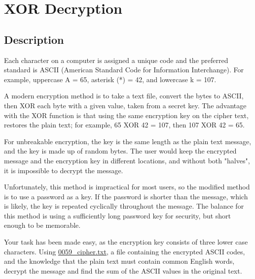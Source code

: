 \section{XOR Decryption}
\subsection{Description}
Each character on a computer is assigned a unique code and the preferred standard is ASCII (American Standard Code for
Information Interchange). For example, uppercase A = 65, asterisk (*) = 42, and lowercase k = 107.

A modern encryption method is to take a text file, convert the bytes to ASCII, then XOR each byte with a given value,
taken from a secret key. The advantage with the XOR function is that using the same encryption key on the cipher text,
restores the plain text; for example, 65 XOR 42 = 107, then 107 XOR 42 = 65.

For unbreakable encryption, the key is the same length as the plain text message, and the key is made up of random
bytes. The user would keep the encrypted message and the encryption key in different locations, and without both
"halves", it is impossible to decrypt the message.

Unfortunately, this method is impractical for most users, so the modified method is to use a password as a key. If the
password is shorter than the message, which is likely, the key is repeated cyclically throughout the message. The
balance for this method is using a sufficiently long password key for security, but short enough to be memorable.

Your task has been made easy, as the encryption key consists of three lower case characters. Using
\href{https://projecteuler.net/resources/documents/0059_cipher.txt}{0059\_cipher.txt}, a file containing the encrypted
ASCII codes, and the knowledge that the plain text must contain common English words, decrypt the message and find the
sum of the ASCII values in the original text.

